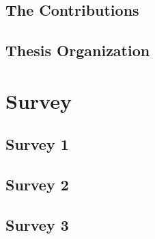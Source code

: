 \documentclass[10pt]{llncs}
\begin{document}


%
\subsection{The Contributions}


%
\subsection{Thesis Organization}


%
\section{Survey}


%
\subsection{Survey 1}






%
\subsection{Survey 2}






%
\subsection{Survey 3}






%
\end{document}

